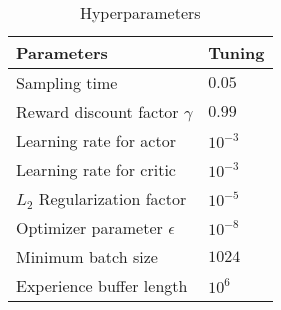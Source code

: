 \begin{table}[h!]
    \caption{Hyperparameters}
    \label{tab:TrainingParams}
    \centering
    \begin{tabular}{l|l}
        \textbf{Parameters} & \textbf{Tuning} \\%
        \hline
        Sampling time                   & $0.05$  \\   %
        Reward discount factor $\gamma$ & $0.99$  \\   %
        Learning rate for actor         & $10^{-3}$ \\%
        Learning rate for critic        & $10^{-3}$ \\%
        $L_2$ Regularization factor     & $10^{-5}$ \\%
        Optimizer parameter $\epsilon$  & $10^{-8}$ \\%
        Minimum batch size              & $1024$  \\%
        Experience buffer length        & $10^{6}$  \\%
    \end{tabular}
\end{table}